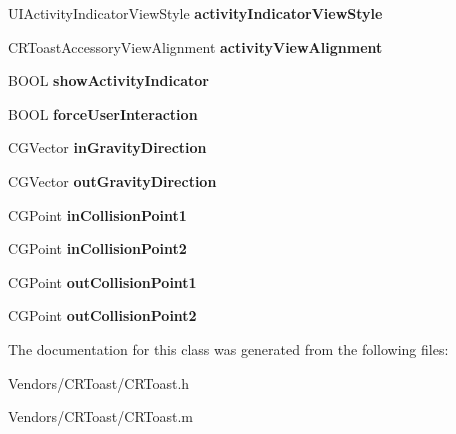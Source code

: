 \begin{DoxyCompactItemize}
\item 
\hypertarget{interface_c_r_toast_a301f811a344c5b62475ade77a9183753}{}U\+I\+Activity\+Indicator\+View\+Style {\bfseries activity\+Indicator\+View\+Style}\label{interface_c_r_toast_a301f811a344c5b62475ade77a9183753}

\item 
\hypertarget{interface_c_r_toast_a29ae92dcb960d5cc391cc7a8aacd4f7b}{}C\+R\+Toast\+Accessory\+View\+Alignment {\bfseries activity\+View\+Alignment}\label{interface_c_r_toast_a29ae92dcb960d5cc391cc7a8aacd4f7b}

\item 
\hypertarget{interface_c_r_toast_a045bdc44bc3348a46ecdedc69d874d62}{}B\+O\+O\+L {\bfseries show\+Activity\+Indicator}\label{interface_c_r_toast_a045bdc44bc3348a46ecdedc69d874d62}

\item 
\hypertarget{interface_c_r_toast_acca1b864567faa39e84bc90177d1bea7}{}B\+O\+O\+L {\bfseries force\+User\+Interaction}\label{interface_c_r_toast_acca1b864567faa39e84bc90177d1bea7}

\item 
\hypertarget{interface_c_r_toast_a0c0a7920077af1b58eb2adc259d12f11}{}C\+G\+Vector {\bfseries in\+Gravity\+Direction}\label{interface_c_r_toast_a0c0a7920077af1b58eb2adc259d12f11}

\item 
\hypertarget{interface_c_r_toast_a1b930d5cea15e2e5d83aec051b1bf602}{}C\+G\+Vector {\bfseries out\+Gravity\+Direction}\label{interface_c_r_toast_a1b930d5cea15e2e5d83aec051b1bf602}

\item 
\hypertarget{interface_c_r_toast_a055c8e3b2e757b5b9619f114ae5e265d}{}C\+G\+Point {\bfseries in\+Collision\+Point1}\label{interface_c_r_toast_a055c8e3b2e757b5b9619f114ae5e265d}

\item 
\hypertarget{interface_c_r_toast_a513e584db7e4ecda4550c3d185039533}{}C\+G\+Point {\bfseries in\+Collision\+Point2}\label{interface_c_r_toast_a513e584db7e4ecda4550c3d185039533}

\item 
\hypertarget{interface_c_r_toast_a253fb41982d5cae984be45a01ff77d6f}{}C\+G\+Point {\bfseries out\+Collision\+Point1}\label{interface_c_r_toast_a253fb41982d5cae984be45a01ff77d6f}

\item 
\hypertarget{interface_c_r_toast_a1579638ac0dd55e3df49e06540919a53}{}C\+G\+Point {\bfseries out\+Collision\+Point2}\label{interface_c_r_toast_a1579638ac0dd55e3df49e06540919a53}

\end{DoxyCompactItemize}


The documentation for this class was generated from the following files\+:\begin{DoxyCompactItemize}
\item 
Vendors/\+C\+R\+Toast/C\+R\+Toast.\+h\item 
Vendors/\+C\+R\+Toast/C\+R\+Toast.\+m\end{DoxyCompactItemize}
